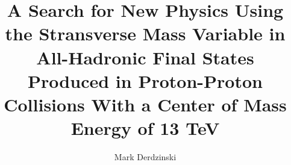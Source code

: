 \title{A Search for New Physics Using the Stransverse Mass Variable in All-Hadronic Final States Produced in Proton-Proton Collisions With a Center of Mass Energy of 13 TeV}

\author{Mark Derdzinski}





